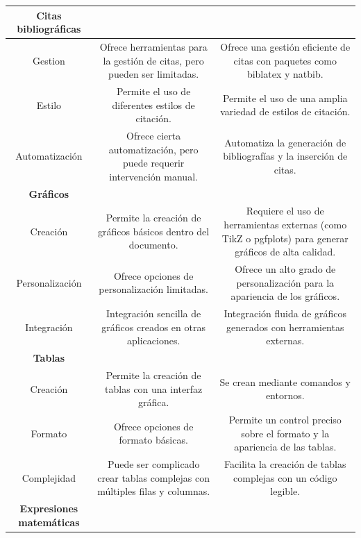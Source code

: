 \documentclass[12pt,twocolumn]{article}
\begin{document}
\begin{table}[ht!]
{\begin{tabular}{|c|c|c|}
            \rowcolor{gray!30}
            \textbf{Citas bibliográficas}         &         &                   \\ \hline
            {Gestion}         & Ofrece herramientas para la gestión de citas, pero pueden ser limitadas.          & Ofrece una gestión eficiente de citas con paquetes como biblatex y natbib.                 \\ \hline
            {Estilo}          & Permite el uso de diferentes estilos de citación.          & Permite el uso de una amplia variedad de estilos de citación.\\ \hline
            {Automatización}  & Ofrece cierta automatización, pero puede requerir intervención manual.          & Automatiza la generación de bibliografías y la inserción de citas.                \\ \hline
            \rowcolor{gray!30}
            \textbf{Gráficos}        &         &                   \\ \hline
            {Creación}        & Permite la creación de gráficos básicos dentro del documento.          & Requiere el uso de herramientas externas (como TikZ o pgfplots) para generar gráficos de alta calidad.                \\ \hline
            {Personalización} & Ofrece opciones de personalización limitadas.          & Ofrece un alto grado de personalización para la apariencia de los gráficos.\\ \hline
            {Integración}     & Integración sencilla de gráficos creados en otras aplicaciones.          & Integración fluida de gráficos generados con herramientas externas.              \\ \hline
            \rowcolor{gray!30}
            \textbf{Tablas}          &         &                   \\ \hline
            {Creación}        & Permite la creación de tablas con una interfaz gráfica.        & Se crean mediante comandos y entornos.                \\ \hline
            {Formato}         & Ofrece opciones de formato básicas.          & Permite un control preciso sobre el formato y la apariencia de las tablas.\\ \hline
            {Complejidad}     & Puede ser complicado crear tablas complejas con múltiples filas y columnas.          & Facilita la creación de tablas complejas con un código legible.              \\ \hline
            \rowcolor{gray!30}
            \textbf{Expresiones matemáticas}          &         &                   \\ \hline

\end{tabular}}
\end{table}
\end{document}
